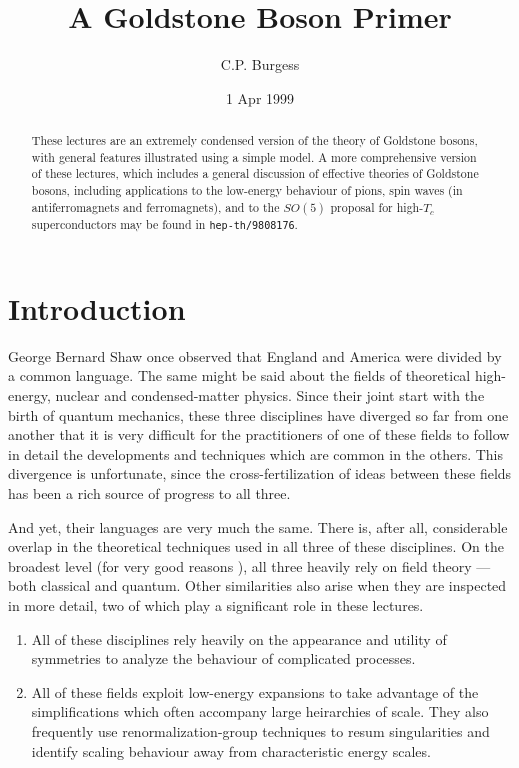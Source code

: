 \documentclass[12pt]{article}
\begin{document}
\title{A Goldstone Boson Primer}
\author{C.P. Burgess}
\date{1 Apr 1999}
\maketitle
{}

\begin{abstract}
These lectures are an extremely condensed 
version of the theory of Goldstone bosons, with general
features illustrated using a simple model. A more comprehensive 
version of these lectures, which includes a general discussion
of effective theories of Goldstone bosons,  
including applications to the low-energy behaviour of
pions, spin waves (in antiferromagnets and ferromagnets), and to
the $SO(5)$ proposal for high-$T_c$ superconductors may be
found in {\tt hep-th/9808176}.
\end{abstract}

\section{Introduction}

George Bernard Shaw once observed that England and America
were divided by a common language. The same might be
said about the fields of theoretical high-energy, nuclear and 
condensed-matter physics. 
Since their joint start with the birth of quantum mechanics,
these three disciplines have diverged so far from one
another that it is very difficult for the practitioners of one
of these fields to follow in detail the developments and
techniques which are common in the others. This divergence
is unfortunate, since the cross-fertilization of ideas between
these fields has been a rich source of progress to all three.

And yet, their languages are very much the same.
There is, after all, considerable overlap in the 
theoretical techniques used in all three of these disciplines. 
On the broadest level (for very good reasons 
\cite{Weinberg96,Weinberg95/96}), 
all three heavily rely on field theory --- both classical and quantum. 
Other similarities also arise when they are inspected in more
detail, two of which play a significant role in these lectures. 

\begin{enumerate}
\item
All of these disciplines rely heavily on the appearance and utility 
of symmetries to analyze the behaviour of complicated processes. 
%
\item
All of these fields exploit low-energy expansions to take
advantage of the simplifications which often accompany large
heirarchies of scale. They also frequently use renormalization-group
techniques to resum singularities and identify scaling behaviour
away from characteristic energy scales. 
%
\end{enumerate}
\end{document}
